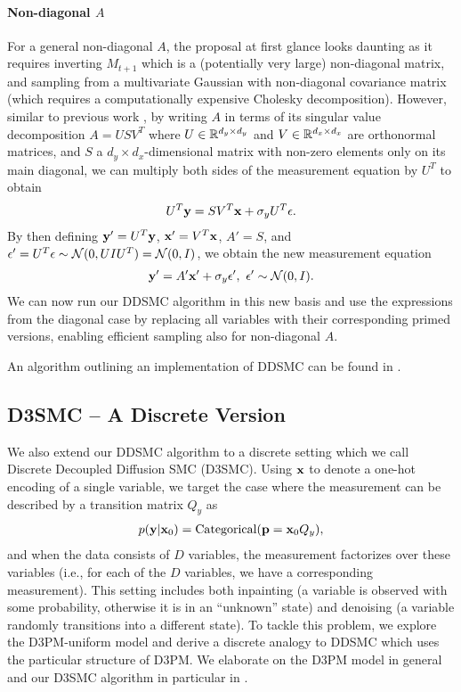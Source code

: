\documentclass{proc}
\begin{document}
\paragraph{Non-diagonal $A$}
For a general non-diagonal $A$, the proposal at first glance looks daunting as it requires inverting $M_{t+1}$ which is a (potentially very large) non-diagonal matrix, and sampling from a multivariate Gaussian with non-diagonal covariance matrix (which requires a computationally expensive Cholesky decomposition). However, similar to previous work \citep{kawar_snips_2021, kawar_denoising_2022, cardoso_monte_2023-2}, by writing $A$ in terms of its singular value decomposition $A=USV^T$ where $U\in\mathbb{R}^{d_y\times d_y}$ and $V\in \mathbb{R}^{d_x\times d_x}$ are orthonormal matrices, and $S$ a $d_y \times d_x$-dimensional matrix with non-zero elements only on its main diagonal, we can multiply both sides of the measurement equation by $U^T$ to obtain
\begin{align}
    U^T \mathbf{y} = SV^T \mathbf{x} + \sigma_y U^T\epsilon.
\end{align}
By then defining $\mathbf{y}' = U^T\mathbf{y}$, $\mathbf{x}' = V^T \mathbf{x}$, $A'=S$, and $\epsilon' = U^T {\epsilon} \sim\mathcal{N}(0, UIU^T) = \mathcal{N}(0, I)$, we obtain the new measurement equation
\begin{align}
    \mathbf{y}' = A'\mathbf{x}' + \sigma_y \epsilon', \ {\epsilon}' \sim \mathcal{N}(0, I).
\end{align}
We can now run our DDSMC algorithm in this new basis and use the expressions from the diagonal case by replacing all variables with their corresponding primed versions, enabling efficient sampling also for non-diagonal $A$.

An algorithm outlining an implementation of DDSMC can be found in .





\subsection{D3SMC -- A Discrete Version}
We also extend our DDSMC algorithm to a discrete setting which we call Discrete Decoupled Diffusion SMC (D3SMC). Using $\mathbf{x}$ to denote a one-hot encoding of a single variable, we target the case where the measurement can be described by a transition matrix $Q_y$ as
\begin{align}
    p(\mathbf{y}|\mathbf{x}_0) = \text{Categorical}({\mathbf{p}} = \mathbf{x}_0 Q_y), \label{eq:discrete_meas}
\end{align}
and when the data consists of $D$ variables, the measurement factorizes over these variables (i.e., for each of the $D$ variables, we have a corresponding measurement). This setting includes both inpainting (a variable is observed with some probability, otherwise it is in an ``unknown'' state) and denoising (a variable randomly transitions into a different state). To tackle this problem, we explore the D3PM-uniform model \citep{austin_structured_2021} and derive a discrete analogy to DDSMC which uses the particular structure of D3PM. We elaborate on the D3PM model in general and our D3SMC algorithm in particular in .
\end{document}
